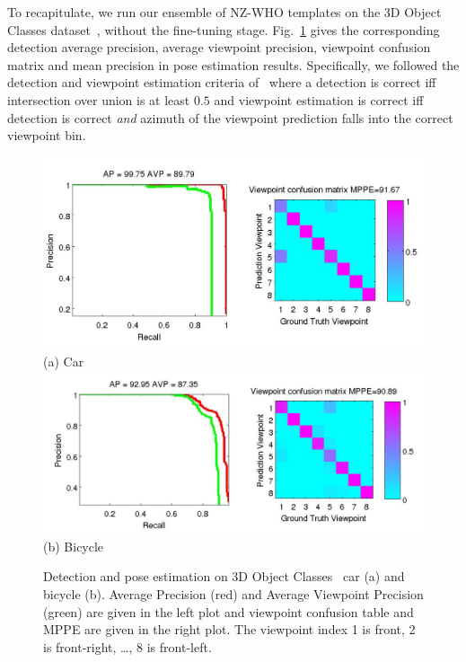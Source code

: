 \documentclass[10pt,twocolumn,letterpaper]{article}
\begin{document}
To recapitulate, we run our ensemble
of NZ-WHO templates on the 3D Object Classes
dataset~\cite{savarese07}, without the fine-tuning
stage. Fig.~\ref{fig:3dobject_ap} gives the corresponding detection
average precision, average viewpoint precision, viewpoint confusion
matrix and mean precision in pose estimation results. Specifically, we
followed the detection and viewpoint estimation criteria
of~\cite{Xiang12} where a detection is correct iff
intersection over union is at least $0.5$ and viewpoint estimation is
correct iff detection is correct \emph{and} azimuth of the viewpoint
prediction falls into the correct viewpoint bin.
%
\begin{figure}[h]
  \centering
  \includegraphics[width=0.99\linewidth]{supp/car_ap_3dobject_tight.png}\\
  \vspace{-5pt}
    (a) Car\\
  \includegraphics[width=0.99\linewidth]{supp/bicycle_ap_3dobject_tight.png}\\
  \vspace{-5pt}
    (b) Bicycle\\
  \caption{Detection and pose estimation on 3D Object
    Classes~\cite{savarese07} car (a) and bicycle (b).
    Average Precision (red) and Average Viewpoint Precision (green)
    are given in the left plot and viewpoint confusion table and MPPE
    are given in the right plot. The viewpoint index 1 is front, 2 is
    front-right, \dots, 8 is front-left.}
  \label{fig:3dobject_ap}
\end{figure}
\end{document}
